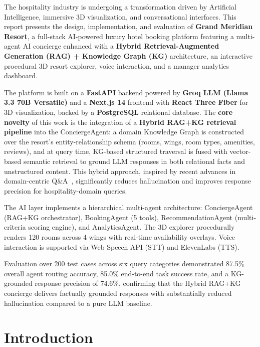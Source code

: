 \documentclass[11pt,a4paper]{report}
\begin{document}
The hospitality industry is undergoing a transformation driven by Artificial Intelligence, immersive 3D visualization, and conversational interfaces. This report presents the design, implementation, and evaluation of \textbf{Grand Meridian Resort}, a full-stack AI-powered luxury hotel booking platform featuring a multi-agent AI concierge enhanced with a \textbf{Hybrid Retrieval-Augmented Generation (RAG) + Knowledge Graph (KG)} architecture, an interactive procedural 3D resort explorer, voice interaction, and a manager analytics dashboard.

The platform is built on a \textbf{FastAPI} backend powered by \textbf{Groq LLM (Llama 3.3 70B Versatile)} and a \textbf{Next.js 14} frontend with \textbf{React Three Fiber} for 3D visualization, backed by a \textbf{PostgreSQL} relational database. The \textbf{core novelty} of this work is the integration of a \textbf{Hybrid RAG+KG retrieval pipeline} into the ConciergeAgent: a domain Knowledge Graph is constructed over the resort's entity-relationship schema (rooms, wings, room types, amenities, reviews), and at query time, KG-based structured traversal is fused with vector-based semantic retrieval to ground LLM responses in both relational facts and unstructured content. This hybrid approach, inspired by recent advances in domain-centric Q\&A~\cite{wan2025hybridrag}, significantly reduces hallucination and improves response precision for hospitality-domain queries.

The AI layer implements a hierarchical multi-agent architecture: ConciergeAgent (RAG+KG orchestrator), BookingAgent (5 tools), RecommendationAgent (multi-criteria scoring engine), and AnalyticsAgent. The 3D explorer procedurally renders 120 rooms across 4 wings with real-time availability overlays. Voice interaction is supported via Web Speech API (STT) and ElevenLabs (TTS).

Evaluation over 200 test cases across six query categories demonstrated 87.5\% overall agent routing accuracy, 85.0\% end-to-end task success rate, and a KG-grounded response precision of 74.6\%, confirming that the Hybrid RAG+KG concierge delivers factually grounded responses with substantially reduced hallucination compared to a pure LLM baseline.

\clearpage
{}

\chapter{Introduction}
\end{document}
